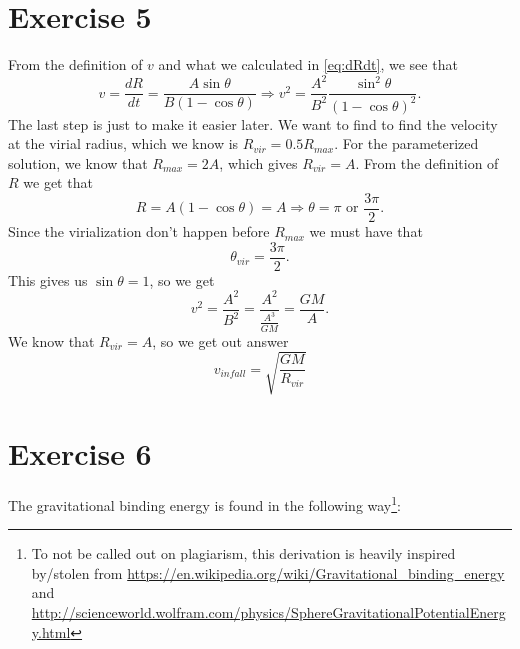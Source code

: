 \documentclass[a4paper,norsk, 10pt]{article}
\begin{document}
\section{Exercise 5}
From the definition of $v$ and what we calculated in \eqref{eq:dRdt}, we see that
\begin{equation}
v = \frac{dR}{dt} = \frac{A\sin\theta}{B(1-\cos \theta)} \Rightarrow v^2 = \frac{A^2}{B^2}\frac{\sin^2 \theta}{(1-\cos \theta)^2}.
\end{equation}
The last step is just to make it easier later. We want to find to find the velocity at the virial radius, which we know is $R_{vir} = 0.5R_{max}$. For the parameterized solution, we know that $R_{max} = 2A$, which gives $R_{vir} = A$. From the definition of $R$ we get that
\begin{equation}
R = A(1-\cos \theta) = A \Rightarrow \theta = \pi \text{ or } \frac{3\pi}{2}. 
\end{equation}
Since the virialization don't happen before $R_{max}$ we must have that
\begin{equation}
\theta_{vir} = \frac{3\pi}{2}.
\end{equation}
This gives us $\sin \theta = 1$, so we get
\begin{equation}
v^2 = \frac{A^2}{B^2} = \frac{A^2}{\frac{A^3}{GM}} = \frac{GM}{A}.
\end{equation}
We know that $R_{vir} = A$, so we get out answer
\begin{equation}
v_{infall} = \sqrt{\frac{GM}{R_{vir}}}
\end{equation}

\section{Exercise 6}
The gravitational binding energy is found in the following way\footnote{To not be called out on plagiarism, this derivation is heavily inspired by/stolen from \url{https://en.wikipedia.org/wiki/Gravitational_binding_energy} and \url{http://scienceworld.wolfram.com/physics/SphereGravitationalPotentialEnergy.html}}:
\end{document}
